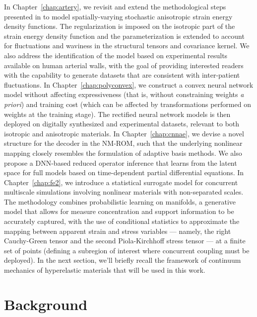 In Chapter~\ref{chap:artery}, we revisit and extend the methodological steps presented in \cite{STABER201894} to model spatially-varying stochastic anisotropic strain energy density functions. The regularization is imposed on the isotropic part of the strain energy density function and the parameterization is extended to account for fluctuations and waviness in the structural tensors and covariance kernel. We also address the identification of the model based on experimental results available on human arterial walls, with the goal of providing interested readers with the capability to generate datasets that are consistent with inter-patient fluctuations. In Chapter~\ref{chap:polyconvex}, we construct a convex neural network model without affecting expressiveness (that is, without constraining weights \textit{a priori}) and training cost (which can be affected by transformations performed on weights at the training stage). The rectified neural network models is then deployed on digitally synthesized and experimental datasets, relevant to both isotropic and anisotropic materials. In Chapter~\ref{chap:cnnae}, we devise a novel structure for the decoder in the NM-ROM, such that the underlying nonlinear mapping closely resembles the formulation of adaptive basis methods. We also propose a DNN-based reduced operator inference that learns from the latent space for full models based on time-dependent partial differential equations. In Chapter~\ref{chap:fe2}, we introduce a statistical surrogate model for concurrent multiscale simulations involving nonlinear materials with non-separated scales. The methodology combines probabilistic learning on manifolds, a generative model that allows for measure concentration and support information to be accurately captured, with the use of conditional statistics to approximate the mapping between apparent strain and stress variables --- namely, the right Cauchy-Green tensor and the second Piola-Kirchhoff stress tensor --- at a finite set of points (defining a subregion of interest where concurrent coupling must be deployed). In the next section, we'll briefly recall the framework of continuum mechanics of hyperelastic materials that will be used in this work.

\section{Background}


